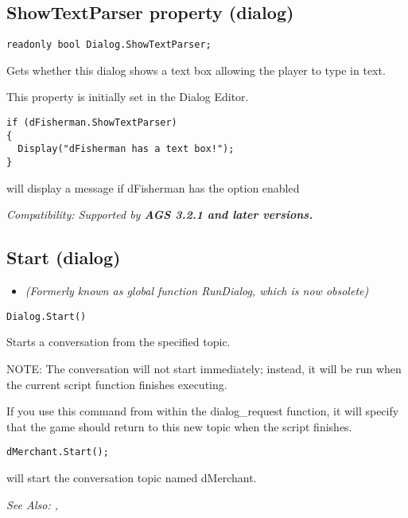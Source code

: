 \subsection{ShowTextParser property (dialog)}\label{Dialog.ShowTextParser}%

\begin{verbatim}
readonly bool Dialog.ShowTextParser;
\end{verbatim}
Gets whether this dialog shows a text box allowing the player to type in text.

This property is initially set in the Dialog Editor.

\begin{verbatim}
if (dFisherman.ShowTextParser)
{
  Display("dFisherman has a text box!");
}
\end{verbatim}
will display a message if dFisherman has the option enabled

\it{Compatibility:} Supported by \bf{AGS 3.2.1} and later versions.


\subsection{Start (dialog)}\label{Dialog.Start}%

\begin{itemize}
\item \it{(Formerly known as global function RunDialog, which is now obsolete)}
\end{itemize}

\begin{verbatim}
Dialog.Start()
\end{verbatim}
Starts a conversation from the specified topic.

NOTE: The conversation will not start immediately; instead, it will be run
when the current script function finishes executing.

If you use this command from within the dialog_request function, it will
specify that the game should return to this new topic when the script finishes.

\begin{verbatim}
dMerchant.Start();
\end{verbatim}
will start the conversation topic named dMerchant.

\it{See Also:} ,


